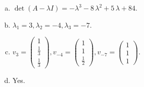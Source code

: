 \begin{questions}
\begin{solution}
\begin{enumerate}[(a)]
\item $\det(A-\lambda I)=-{\lambda}^{3} - 8 \, {\lambda}^{2} + 5 \, {\lambda} + 84$.
\item ${\lambda}_1=3, {\lambda}_2=-4, {\lambda}_3=-7$.
\item $v_{3}=\left(\begin{array}{r}
1 \\
\frac{1}{3} \\
\frac{1}{3}
\end{array}\right), v_{-4}=\left(\begin{array}{r}
1 \\
1 \\
\frac{1}{2}
\end{array}\right), v_{-7}=\left(\begin{array}{r}
1 \\
1 \\
1
\end{array}\right)$.
\item Yes.
\end{enumerate}
\end{solution}

\end{questions}

\newpage


\begin{center}
\end{center}

